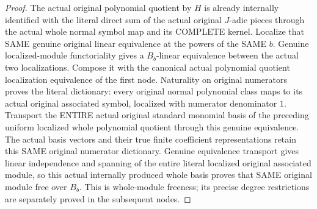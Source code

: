 \begin{proof}
The actual original polynomial quotient by $H$ is already internally
identified with the literal direct sum of the actual original $J$-adic
pieces through the actual whole normal symbol map and its COMPLETE kernel.
Localize that SAME genuine original linear equivalence at the powers of the
SAME $b$. Genuine localized-module functoriality gives a $B_b$-linear
equivalence between the actual two localizations. Compose it with the
canonical actual polynomial quotient localization equivalence of the first
node. Naturality on original numerators proves the literal dictionary:
every original normal polynomial class maps to its actual original
associated symbol, localized with numerator denominator $1$. Transport the
ENTIRE actual original standard monomial basis of the preceding uniform
localized whole polynomial quotient through this genuine equivalence. The
actual basis vectors and their true finite coefficient representations retain
this SAME original numerator dictionary. Genuine equivalence transport gives
linear independence and spanning of the entire literal localized original
associated module, so this actual internally produced whole basis proves
that SAME original module free over $B_b$. This is whole-module freeness;
its precise degree restrictions are separately proved in the subsequent nodes.
\end{proof}

